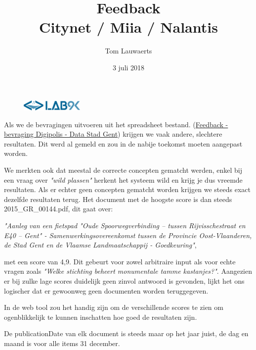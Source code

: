 \documentclass[11pt, letterpaper, oneside]{article}
\title{Feedback \\ Citynet / Miia / Nalantis}
\author{Tom Lauwaerts}
\date{3 juli 2018}
\begin{document}
	\begin{figure}
			\includegraphics[width=0.27\textwidth,keepaspectratio]{figuren/logo} %
	\end{figure}
	\vspace*{0.35cm}
	
	\noindent
	\fontsize{30pt}{28pt}\selectfont\textcolor{priColour}{\textbf{\@title}}\newline
	
	\fontsize{11pt}{15pt}\selectfont
	Als we de bevragingen uitvoeren uit het spreadsheet bestand. (\href{https://docs.google.com/spreadsheets/d/1eH3B7dC7MSjM5RJHtsiqMeepdzvHi-di5VJLD1ZBV-s/edit#gid=967764322}{Feedback - bevraging Digipolis - Data Stad Gent}) krijgen we vaak andere, slechtere resultaten. Dit werd al gemeld en zou in de nabije toekomst moeten aangepast worden.
	
	We merkten ook dat meestal de correcte concepten gematcht werden, enkel bij een vraag over \textit{"wild plassen"} herkent het systeem wild en krijg je dus vreemde resultaten. Als er echter geen concepten gematcht worden krijgen we steeds exact dezelfde resultaten terug. Het document met de hoogste score is dan steeds 2015\_GR\_00144.pdf, dit gaat over:
	
	\medskip
	\textit{"Aanleg van een fietspad "Oude Spoorwegverbinding – tussen Rijvisschestraat en E40 – Gent" - Samenwerkingsovereenkomst tussen de Provincie Oost-Vlaanderen, de Stad Gent en de Vlaamse Landmaatschappij - Goedkeuring"},
	\medskip
	
	met een score van 4,9. Dit gebeurt voor zowel arbitraire input als voor echte vragen zoals \textit{"Welke stichting beheert monumentale tamme kastanjes?"}. Aangezien er bij zulke lage scores duidelijk geen zinvol antwoord is gevonden, lijkt het ons logischer dat er gewoonweg geen documenten worden teruggegeven.
	
	In de web tool zou het handig zijn om de verschillende scores te zien om ogenblikkelijk te kunnen inschatten hoe goed de resultaten zijn.
	
	De publicationDate van elk document is steeds maar op het jaar juist, de dag en maand is voor alle items 31 december.
\end{document}
